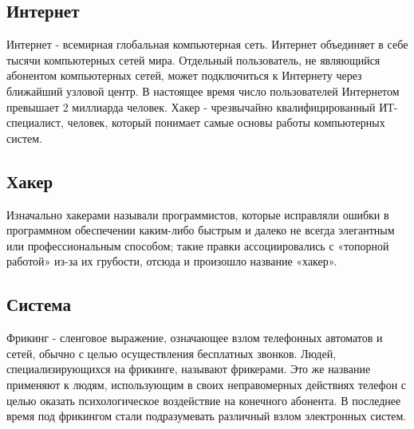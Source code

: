 \subsection*{Интернет}
	Интернет - всемирная глобальная компьютерная сеть. Интернет объединяет в себе тысячи компьютерных сетей мира. Отдельный пользователь, не являющийся абонентом компьютерных сетей, может подключиться к Интернету через ближайший узловой центр. В настоящее время число пользователей Интернетом превышает 2 миллиарда человек. Хакер - чрезвычайно квалифицированный ИТ- специалист, человек, который понимает самые основы работы компьютерных систем.

\subsection*{Хакер}
	Изначально хакерами называли программистов, которые исправляли ошибки в программном обеспечении каким-либо быстрым и далеко не всегда элегантным или профессиональным способом; такие правки ассоциировались с «топорной работой» из-за их грубости, отсюда и произошло название «хакер».

\subsection*{Система}
	Фрикинг - сленговое выражение, означающее взлом телефонных автоматов и сетей, обычно с целью осуществления бесплатных звонков. Людей, специализирующихся на фрикинге, называют фрикерами. Это же название применяют к людям, использующим в своих неправомерных действиях телефон с целью оказать психологическое воздействие на конечного абонента. В последнее время под фрикингом стали подразумевать различный взлом электронных систем.


